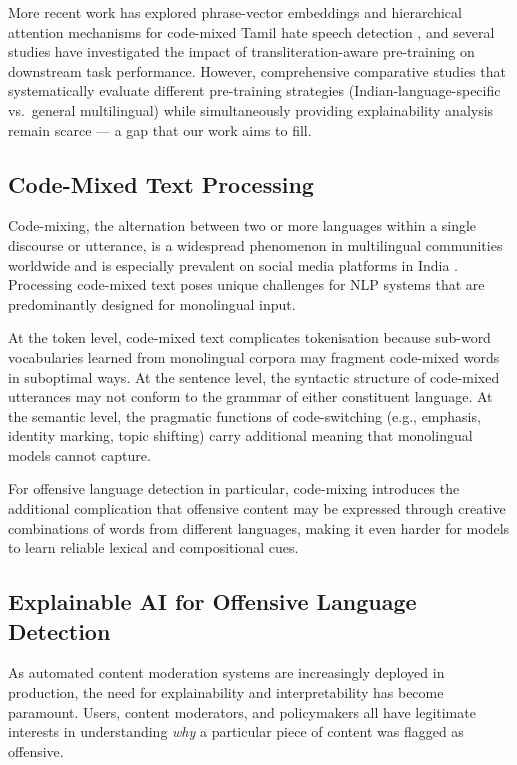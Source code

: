 \documentclass[12pt, a4paper]{article}
\begin{document}
More recent work has explored phrase-vector embeddings and hierarchical attention mechanisms for code-mixed Tamil hate speech detection \citep{subramanian2022phrase}, and several studies have investigated the impact of transliteration-aware pre-training on downstream task performance. However, comprehensive comparative studies that systematically evaluate different pre-training strategies (Indian-language-specific vs.\ general multilingual) while simultaneously providing explainability analysis remain scarce --- a gap that our work aims to fill.

\subsection{Code-Mixed Text Processing}

Code-mixing, the alternation between two or more languages within a single discourse or utterance, is a widespread phenomenon in multilingual communities worldwide and is especially prevalent on social media platforms in India \citep{bali2014borrowing}. Processing code-mixed text poses unique challenges for NLP systems that are predominantly designed for monolingual input.

At the token level, code-mixed text complicates tokenisation because sub-word vocabularies learned from monolingual corpora may fragment code-mixed words in suboptimal ways. At the sentence level, the syntactic structure of code-mixed utterances may not conform to the grammar of either constituent language. At the semantic level, the pragmatic functions of code-switching (e.g., emphasis, identity marking, topic shifting) carry additional meaning that monolingual models cannot capture.

For offensive language detection in particular, code-mixing introduces the additional complication that offensive content may be expressed through creative combinations of words from different languages, making it even harder for models to learn reliable lexical and compositional cues.

\subsection{Explainable AI for Offensive Language Detection}

As automated content moderation systems are increasingly deployed in production, the need for explainability and interpretability has become paramount. Users, content moderators, and policymakers all have legitimate interests in understanding \textit{why} a particular piece of content was flagged as offensive.
\end{document}
